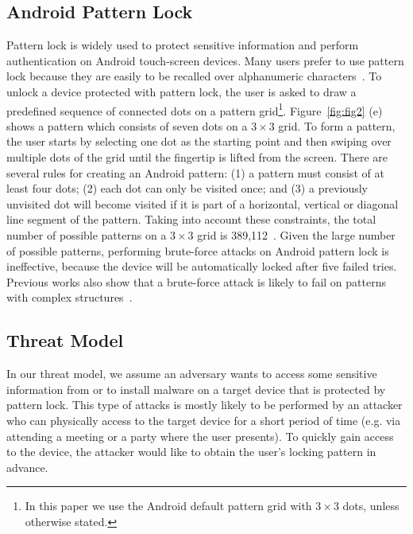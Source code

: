     \subsection{Android Pattern Lock}
    \label{section: android_pattern_lock}
        Pattern lock is widely used to protect sensitive information and perform authentication on
        Android touch-screen devices. Many users prefer to use pattern lock because they
        are easily to be recalled over alphanumeric characters~\cite{standing1970perception,Weiss2008PassShapes}.
        To unlock a device protected with pattern lock, the user is asked to draw a predefined sequence of connected dots on a pattern grid\footnote{In this paper we use the Android default pattern grid with $3 \times 3$ dots, unless otherwise stated.}.
        Figure~\ref{fig:fig2} (e) shows a pattern which consists of seven dots on a $3 \times 3$ grid.
        To form a
        pattern, the user starts by selecting one dot as the
        starting point and then swiping over multiple dots of the grid until the fingertip is lifted from the screen.
        There are several rules for creating an Android pattern: (1) a pattern must consist
        of at least four dots; (2) each dot can only be visited once; and (3) a previously unvisited dot will
        become visited if it is part of a horizontal, vertical or diagonal
        line segment of the pattern. Taking into account these constraints, the total number of possible patterns
        on a $3\times3$ grid is 389,112~\cite{uellenbeck2013quantifying}.
        Given the large number of possible patterns, performing brute-force attacks on
        Android pattern lock is ineffective, because the device will be
        automatically locked after five failed tries.
        Previous works also show that a brute-force attack is likely to fail on  patterns with complex
        structures~\cite{Kelley2012Guess,Mazurek2013Measuring}.

    \subsection{Threat Model}
    \label{sec:scenarios}
        In our threat model, we assume an adversary wants to access some sensitive information from or to install malware on a
target device that is protected by pattern lock. This type of attacks is mostly likely to be performed by an attacker
who can physically access to the target device for a short period of time (e.g. via  attending a meeting or a party where
the user presents). To quickly gain access to the device, the attacker would like to obtain
the user's locking pattern in advance.

